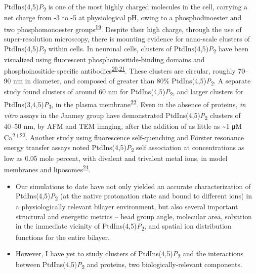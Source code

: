 \documentclass[11pt,notitlepage]{article}
\providecommand{\tightlist}{%
  \setlength{\itemsep}{0pt}\setlength{\parskip}{0pt}}
\begin{document}
PtdIns(4,5)\emph{P}\textsubscript{2} is one of the most highly charged
molecules in the cell, carrying a net charge from -3 to -5 at
physiological pH, owing to a phosphodinoester and two phosphomonoester
groups\textsuperscript{\protect\hyperlink{ref-8pFCG7HG}{19}}. Despite
their high charge, through the use of super-resolution microscopy, there
is mounting evidence for nano-scale clusters of
PtdIns(4,5)\emph{P}\textsubscript{2} within cells. In neuronal cells,
clusters of PtdIns(4,5)\emph{P}\textsubscript{2} have been visualized
using fluorescent phosphoinositide-binding domains and
phosphoinositide-specific
antibodies\textsuperscript{\protect\hyperlink{ref-U2YHSNKE}{20},\protect\hyperlink{ref-Gw4f4Ayu}{21}}.
These clusters are circular, roughly 70--90 nm in diameter, and composed
of greater than 80\% PtdIns(4,5)\emph{P}\textsubscript{2}. A separate
study found clusters of around 60 nm for
PtdIns(4,5)\emph{P}\textsubscript{2}, and larger clusters for
PtdIns(3,4,5)\emph{P}\textsubscript{3}, in the plasma
membrane\textsuperscript{\protect\hyperlink{ref-rvpDeSHJ}{22}}. Even in
the absence of proteins, \emph{in vitro} assays in the Janmey group have
demonstrated PtdIns(4,5)\emph{P}\textsubscript{2} clusters of 40--50 nm,
by AFM and TEM imaging, after the addition of as little as
\textasciitilde{}1 μM
Ca\textsuperscript{2+}\textsuperscript{\protect\hyperlink{ref-LhOwGz4k}{23}}.
Another study using fluorescence self-quenching and Förster resonance
energy transfer assays noted PtdIns(4,5)\emph{P}\textsubscript{2} self
association at concentrations as low as 0.05 mole percent, with divalent
and trivalent metal ions, in model membranes and
liposomes\textsuperscript{\protect\hyperlink{ref-ior8wlwH}{24}}.

\begin{itemize}
\tightlist
\item
  Our simulations to date have not only yielded an accurate
  characterization of PtdIns(4,5)\emph{P}\textsubscript{2} (at the
  native protonation state and bound to different ions) in a
  physiologically relevant bilayer environment, but also several
  important structural and energetic metrics -- head group angle,
  molecular area, solvation in the immediate vicinity of
  PtdIns(4,5)\emph{P}\textsubscript{2}, and spatial ion distribution
  functions for the entire bilayer.
\item
  However, I have yet to study clusters of
  PtdIns(4,5)\emph{P}\textsubscript{2} and the interactions between
  PtdIns(4,5)\emph{P}\textsubscript{2} and proteins, two
  biologically-relevant components.
\end{itemize}
\end{document}
